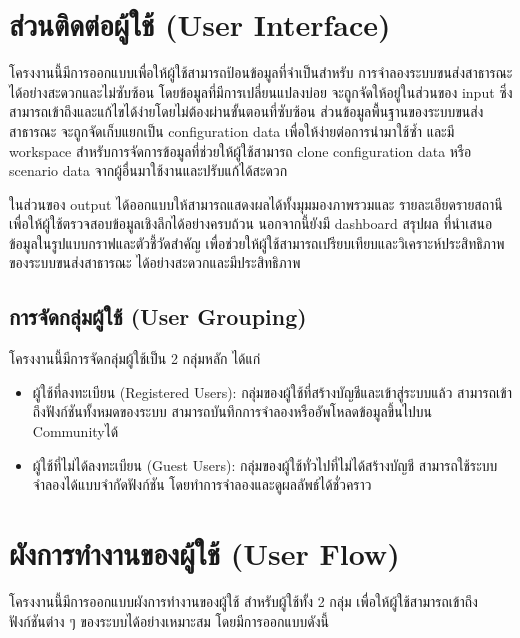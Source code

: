 \section{ส่วนติดต่อผู้ใช้ (User Interface)}
\begin{mypara}
    \indent โครงงานนี้มีการออกแบบเพื่อให้ผู้ใช้สามารถป้อนข้อมูลที่จำเป็นสำหรับ
    การจำลองระบบขนส่งสาธารณะได้อย่างสะดวกและไม่ซับซ้อน 
    โดยข้อมูลที่มีการเปลี่ยนแปลงบ่อย จะถูกจัดให้อยู่ในส่วนของ input 
    ซึ่งสามารถเข้าถึงและแก้ไขได้ง่ายโดยไม่ต้องผ่านขั้นตอนที่ซับซ้อน 
    ส่วนข้อมูลพื้นฐานของระบบขนส่งสาธารณะ จะถูกจัดเก็บแยกเป็น configuration data 
    เพื่อให้ง่ายต่อการนำมาใช้ซ้ำ และมี workspace สำหรับการจัดการข้อมูลที่ช่วยให้ผู้ใช้สามารถ 
    clone configuration data หรือ scenario data จากผู้อื่นมาใช้งานและปรับแก้ได้สะดวก

  \indent ในส่วนของ output ได้ออกแบบให้สามารถแสดงผลได้ทั้งมุมมองภาพรวมและ
  รายละเอียดรายสถานี เพื่อให้ผู้ใช้ตรวจสอบข้อมูลเชิงลึกได้อย่างครบถ้วน นอกจากนี้ยังมี 
  dashboard สรุปผล ที่นำเสนอข้อมูลในรูปแบบกราฟและตัวชี้วัดสำคัญ 
  เพื่อช่วยให้ผู้ใช้สามารถเปรียบเทียบและวิเคราะห์ประสิทธิภาพของระบบขนส่งสาธารณะ
  ได้อย่างสะดวกและมีประสิทธิภาพ
\end{mypara}

\subsection{การจัดกลุ่มผู้ใช้ (User Grouping)}
\begin{mypara}
\indent โครงงานนี้มีการจัดกลุ่มผู้ใช้เป็น 2 กลุ่มหลัก ได้แก่
\begin{itemize}
    \item ผู้ใช้ที่ลงทะเบียน (Registered Users): กลุ่มของผู้ใช้ที่สร้างบัญชีและเข้าสู่ระบบแล้ว 
    สามารถเข้าถึงฟังก์ชันทั้งหมดของระบบ สามารถบันทึกการจำลองหรืออัพโหลดข้อมูลขึ้นไปบน Communityได้ 
    \item ผู้ใช้ที่ไม่ได้ลงทะเบียน (Guest Users): กลุ่มของผู้ใช้ทั่วไปที่ไม่ได้สร้างบัญชี 
    สามารถใช้ระบบจำลองได้แบบจำกัดฟังก์ชัน โดยทำการจำลองและดูผลลัพธ์ได้ชั่วคราว 
\end{itemize}
\end{mypara}
\section{ผังการทำงานของผู้ใช้ (User Flow)}
\begin{mypara}
    \indent โครงงานนี้มีการออกแบบผังการทำงานของผู้ใช้ สำหรับผู้ใช้ทั้ง 2 กลุ่ม เพื่อให้ผู้ใช้สามารถเข้าถึงฟังก์ชันต่าง ๆ ของระบบได้อย่างเหมาะสม 
    โดยมีการออกแบบดังนี้
\end{mypara}
